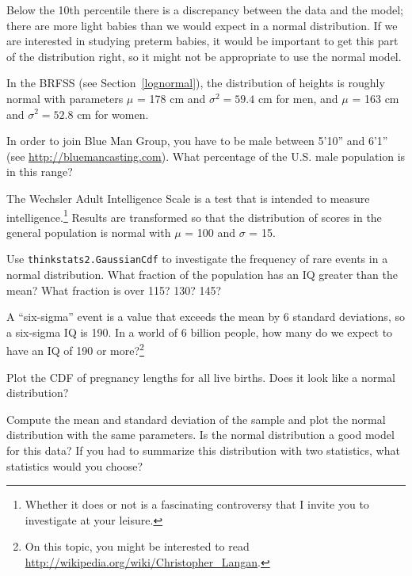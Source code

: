 \documentclass[12pt]{book}
\begin{document}
Below the 10th percentile there is a discrepancy between the data
and the model; there are more light babies than we would expect in
a normal distribution.  If we are interested in studying preterm
babies, it would be important to get this part of the distribution
right, so it might not be appropriate to use the normal
model.

\begin{exercise}
In the BRFSS (see Section~\ref{lognormal}), the distribution of
heights is roughly normal with parameters $\mu$ = 178 cm and
$\sigma^2 = 59.4$ cm for men, and $\mu$ = 163 cm and $\sigma^2 = 52.8$ cm for
women.

In order to join Blue Man Group, you have to be male between 5'10''
and 6'1'' (see \url{http://bluemancasting.com}).  What percentage of the
U.S. male population is in this range?
\end{exercise}

\begin{exercise}
The Wechsler Adult Intelligence Scale is a test that is intended
to measure intelligence.\footnote{Whether it does or not is a
fascinating controversy that I invite you to investigate at your
leisure.}  Results are transformed so that the distribution of scores
in the general population is normal with $\mu$ = 100 and $\sigma$ = 15.

Use {\tt thinkstats2.GaussianCdf} to investigate the frequency of rare
events in a normal distribution.  What fraction of the population has
an IQ greater than the mean?  What fraction is over 115?  130?  145?

A ``six-sigma'' event is a value that exceeds the mean by 6 standard
deviations, so a six-sigma IQ is 190.  In a world of 6 billion people,
how many do we expect to have an IQ of 190 or more?\footnote{On this
  topic, you might be interested to read
  \url{http://wikipedia.org/wiki/Christopher_Langan}.}

\end{exercise}


\begin{exercise}
Plot the CDF of pregnancy lengths for all live births.  Does it
look like a normal distribution?

Compute the mean and standard deviation of the sample and plot the
normal distribution with the same parameters.  Is the normal
distribution a good model for this data?  If you had to summarize this
distribution with two statistics, what statistics would you choose?

\end{exercise}
\end{document}
